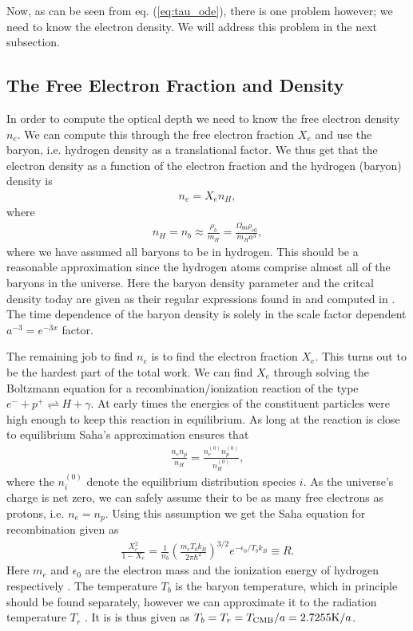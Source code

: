 \documentclass[twocolumn]{aastex62}
\begin{document}
Now, as can be seen from eq. (\ref{eq:tau_ode}), there is one problem however; we need to know the electron density. We will address this problem in the next subsection.

\subsection{The Free Electron Fraction and Density}
In order to compute the optical depth we need to know the free electron density $n_e$. We can compute this through the free electron fraction $X_e$ and use the baryon, i.e. hydrogen density as a translational factor. We thus get that the electron density as a function of the electron fraction and the hydrogen (baryon) density is 
\begin{align}
    n_e = X_e n_H,
\end{align}
where 
\begin{align}
    n_H = n_b \approx \frac{\rho_b}{m_H} = \frac{\Omega_{b0} \rho_{c0}}{m_H a^3},
\end{align}
where we have assumed all baryons to be in hydrogen. This should be a reasonable approximation since the hydrogen atoms comprise almost all of the baryons in the universe. Here the baryon density parameter and the critcal density today are given as their regular expressions found in and computed in \cite{stutzer:2020}. The time dependence of the baryon density is solely in the scale factor dependent $a^{-3} = e^{-3x}$ factor. 

The remaining job to find $n_e$ is to find the electron fraction $X_e$. This turns out to be the hardest part of the total work. We can find $X_e$ through solving the Boltzmann equation for a recombination/ionization reaction of the type $e^{-} + p^{+} \rightleftharpoons H + \gamma$. At early times the energies of the constituent particles were high enough to keep this reaction in equilibrium. As long at the reaction is close to equilibrium Saha's approximation \citep[p. 70]{dodelson:2003} ensures that 
\begin{align}
    \frac{n_e n_p}{n_H} = \frac{n_e^{(0)}n_p^{(0)}}{n_H^{(0)}},
\end{align}
where the $n_i^{(0)}$ denote the equilibrium distribution species $i$. As the universe's charge is net zero, we can safely assume their to be as many free electrons as protons, i.e. $n_e = n_p$. Using this assumption we get the Saha equation for recombination given as 
\begin{align}
    \frac{X_e^2}{1 - X_e} = \frac{1}{n_b} \left(\frac{m_e
    T_bk_B}{2\pi\hbar^2}\right)^{3/2} e^{-\epsilon_0/T_bk_B} \equiv R.
    \label{eq:Saha_eq}
\end{align}
Here $m_e$ and $\epsilon_0$ are the electron mass and the ionization energy of hydrogen respectively \citep[]{winther:2020}. The temperature $T_b$ is the baryon temperature, which in principle should be found separately, however we can approximate it to the radiation temperature $T_r$ \citep[]{winther:2020}. It is is thus given as $T_b =
T_r = T_{\rm CMB} / a = 2.7255 \textrm{K} / a$.
\end{document}
